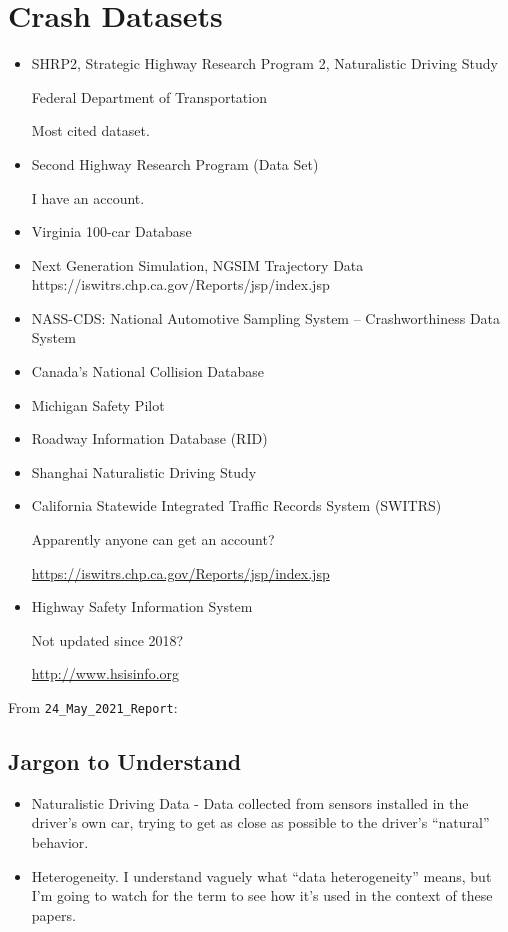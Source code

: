 \section{Crash Datasets}

\begin{itemize}
	\item SHRP2,  Strategic Highway Research Program 2, Naturalistic Driving Study
	
	Federal Department of Transportation
	
	Most cited dataset.  
	
	\item Second Highway Research Program (Data Set)
	
	I have an account.  
	\item Virginia 100-car Database 
	\item Next Generation Simulation, NGSIM Trajectory Data
	https://iswitrs.chp.ca.gov/Reports/jsp/index.jsp
	\item NASS-CDS:  National Automotive Sampling System – Crashworthiness Data System
	\item Canada's National Collision Database
	\item Michigan Safety Pilot
	\item Roadway Information Database (RID)
	\item Shanghai Naturalistic Driving Study	
	\item California Statewide Integrated Traffic Records System (SWITRS)
	
	Apparently anyone can get an account?
	
	\url{https://iswitrs.chp.ca.gov/Reports/jsp/index.jsp}
	\item Highway Safety Information System
	
	Not updated since 2018?
	
	\url{http://www.hsisinfo.org}
\end{itemize}

From \verb|24_May_2021_Report|:

\subsection{Jargon to Understand}

\begin{itemize}
	\item Naturalistic Driving Data - Data collected from sensors installed in the driver's own car, trying to get as close as possible to the driver's ``natural'' behavior. 
	\item Heterogeneity.  I understand vaguely what ``data heterogeneity'' means, but I'm going to watch for the term to see how it's used in the context of these papers.  
\end{itemize}

